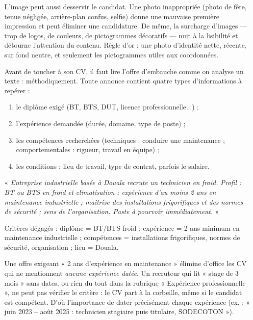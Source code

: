 \documentclass[11pt]{article}
\newcommand{\cle}[1]{{\popxbold\color{popdark}#1}}
\newcounter{popsec}
\newcounter{popsub}
\newcommand{\courssub}[1]{%
  \stepcounter{popsub}%
  \par\vspace{9pt}\noindent{\popxbold\fontsize{11.5}{13}\selectfont\color{popink}{\color{poporange}\thepopsec.\thepopsub}\hspace{6pt}#1}\par\nopagebreak\vspace{4pt}
}
\begin{document}
\begin{attention}
L'image peut aussi desservir le candidat. Une \cle{photo inappropriée} (photo de fête, tenue négligée, arrière-plan confus, selfie) donne une mauvaise première impression et peut éliminer une candidature. De même, la \cle{surcharge} d'images — trop de logos, de couleurs, de pictogrammes décoratifs — nuit à la lisibilité et détourne l'attention du contenu. Règle d'or : une photo d'identité nette, récente, sur fond neutre, et seulement les pictogrammes utiles aux coordonnées.
\end{attention}

\courssub{Analyser une offre d'embauche}

Avant de toucher à son CV, il faut lire l'offre d'embauche comme on analyse un texte : méthodiquement. Toute annonce contient quatre types d'informations à repérer :

\begin{enumerate}
\item le \cle{diplôme} exigé (BT, BTS, DUT, licence professionnelle...) ;
\item l'\cle{expérience} demandée (durée, domaine, type de poste) ;
\item les \cle{compétences} recherchées (techniques : conduire une maintenance ; comportementales : rigueur, travail en équipe) ;
\item les \cle{conditions} : lieu de travail, type de contrat, parfois le salaire.
\end{enumerate}

\begin{exemplebox}
« \emph{Entreprise industrielle basée à Douala recrute un technicien en froid. Profil : BT ou BTS en froid et climatisation ; expérience d'au moins 2 ans en maintenance industrielle ; maîtrise des installations frigorifiques et des normes de sécurité ; sens de l'organisation. Poste à pourvoir immédiatement.} »

Critères dégagés : diplôme = BT/BTS froid ; expérience = 2 ans minimum en maintenance industrielle ; compétences = installations frigorifiques, normes de sécurité, organisation ; lieu = Douala.
\end{exemplebox}

\begin{exemplebox}
Une offre exigeant « 2 ans d'expérience en maintenance » élimine d'office les CV qui ne mentionnent \emph{aucune expérience datée}. Un recruteur qui lit « stage de 3 mois » sans dates, ou rien du tout dans la rubrique « Expérience professionnelle », ne peut pas vérifier le critère : le CV part à la corbeille, même si le candidat est compétent. D'où l'importance de dater précisément chaque expérience (ex. : « juin 2023 -- août 2025 : technicien stagiaire puis titulaire, SODECOTON »).
\end{exemplebox}
\end{document}
